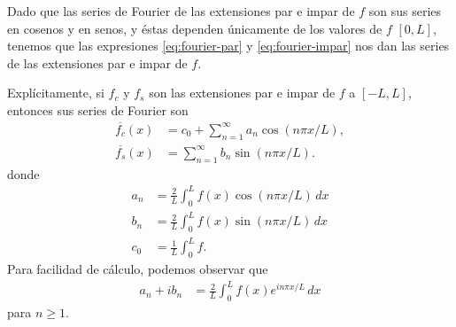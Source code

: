 \documentclass[11pt,letterpaper,draft]{report}
\theoremstyle{plain}
\theoremstyle{definition}
\theoremstyle{remark}
\newcommand\<{\langle}
\renewcommand\>{\rangle}
\begin{document}
Dado que las series de Fourier de las extensiones par e impar de $f$
son sus series en cosenos y en senos, y éstas dependen únicamente de
los valores de $f$ $[0,L]$, tenemos que las
expresiones \eqref{eq:fourier-par} y \eqref{eq:fourier-impar}
nos dan las series de las extensiones par e impar de $f$.

Explícitamente, si $f_c$ y $f_s$ son las extensiones par e impar
de $f$ a $[-L,L]$, entonces sus series de Fourier son
\begin{align*}
  \overline{f_c}(x) &= c_0 + \sum_{n=1}^{\infty}a_n\cos(n\pi x/L), \\
  \overline{f_s}(x) &= \sum_{n=1}^{\infty}b_n\sin(n\pi x/L).
\end{align*}
donde
\begin{align*}
  a_n &= \frac{2}{L}\int_{0}^L f(x)\cos(n\pi x/L)\,dx \\
  b_n &= \frac{2}{L}\int_{0}^L f(x)\sin(n\pi x/L)\,dx \\
  c_0 &= \frac{1}{L}\int_{0}^L f.
\end{align*}
Para facilidad de cálculo, podemos observar que
\begin{align*}
  a_n+ib_n
  &= \frac{2}{L}\int_0^L f(x)e^{in\pi x/L}\,dx
\end{align*}
para $n\geq 1$.
\end{document}
